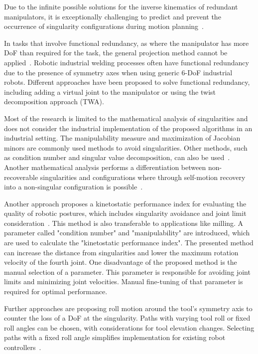 Due to the infinite possible solutions for the inverse kinematics of redundant manipulators, it is exceptionally challenging to predict and prevent the occurrence of singularity configurations during motion planning~\cite{Shi.2021}.

In tasks that involve functional redundancy, as where the manipulator has more \acrshort{DoF} than required for the task, the general projection method cannot be applied~\cite{Wei.2014}. Robotic industrial welding processes often have functional redundancy due to the presence of symmetry axes when using generic 6-\acrshort{DoF} industrial robots. Different approaches have been proposed to solve functional redundancy, including adding a virtual joint to the manipulator or using the twist decomposition approach (\acrshort{TWA}).

Most of the research is limited to the mathematical analysis of singularities and does not consider the industrial implementation of the proposed algorithms in an industrial setting. The manipulability measure and maximization of Jacobian minors are commonly used methods to avoid singularities. Other methods, such as condition number and singular value decomposition, can also be used~\cite{Stevenson.}. Another mathematical analysis performs a differentiation between non-recoverable singularities and configurations where through self-motion recovery into a non-singular configuration is possible~\cite{Bedrossian.2002}.

Another approach proposes a kinetostatic performance index for evaluating the quality of robotic postures, which includes singularity avoidance and joint limit consideration~\cite{Huo.2008}. This method is also transferable to applications like milling. A parameter called "condition number" and "manipulability" are introduced, which are used to calculate the "kinetostatic performance index". The presented method can increase the distance from singularities and lower the maximum rotation velocity of the fourth joint. One disadvantage of the proposed method is the manual selection of a parameter. This parameter is responsible for avoiding joint limits and minimizing joint velocities. Manual fine-tuning of that parameter is required for optimal performance. 

Further approaches are proposing roll motion around the tool's symmetry axis to counter the loss of a \acrshort{DoF} at the singularity. Paths with varying tool roll or fixed roll angles can be chosen, with considerations for tool elevation changes. Selecting paths with a fixed roll angle simplifies implementation for existing robot controllers~\cite{Milenkovic.2021}.

